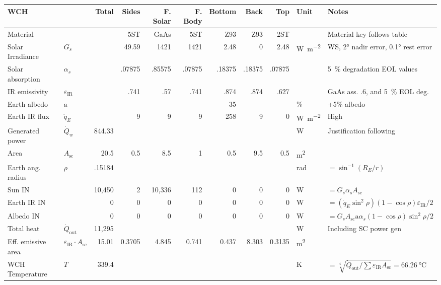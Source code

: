\documentclass[9pt]{article}
\begin{document}
\begin{landscape}
  \begin{table}[h]
    \centering
    \begin{tabularx}{1.00\linewidth}{ll|r|rrrrrr|l|X}
      \toprule
      WCH & & Total & Sides & F. Solar & F. Body & Bottom & Back & Top & Unit & Notes\\
      \midrule
      Material & & & 5ST & GaAs & 5ST & Z93 & Z93 & 2ST & & Material key follows table\\
      \midrule
      Solar Irradiance & $G_s$ & & 49.59 & 1421 & 1421 & 2.48 & 0 & 2.48 & \si{\watt\per\meter\squared} & WS, \ang{2} nadir error, \ang{0.1} rest error\\
      Solar absorption & $\alpha_s$ & & .07875 & .85575 & .07875 & .18375 & .18375 & .07875 & & \qty{5}{\percent} degradation EOL values\\
      IR emissivity & $\varepsilon_\text{IR}$ & & .741 & .57 & .741 & .874 & .874 & .627 & & GaAs ass. .6, and \qty{5}{\percent} EOL deg.\\
      Earth albedo & $\mathrm{a}$ & & & & & 35 &  & & \si{\percent} & +5\% albedo\\
      Earth IR flux & $\dot q_E$ & & 9 & 9 & 9 & 258 & 9 & 0 & \si{\watt\per\meter\squared} & High\\
      Generated power & $\dot Q_w$ & 844.33 & & & & & & & \si{\watt} & Justification following\\
      Area & $A_\text{sc}$ & 20.5 & 0.5 & 8.5 & 1 & 0.5 & 9.5 & 0.5 & \si{\meter\squared} & \\
      Earth ang. radius & $\rho$ & .15184 & & & & & & & \si{rad} & $=\sin^{-1}(R_E/r)$\\
      \midrule
      Sun IN & & 10,450 & 2 & 10,336 & 112 & 0 & 0 & 0 & \si{\watt} & $=G_s\alpha_s A_\text{sc}$\\
      Earth IR IN & & 0 & 0 & 0 & 0 & 0 & 0 & 0 & \si{\watt} & $=(\dot q_E\sin^2\rho)(1-\cos\rho)\varepsilon_\text{IR}/2$\\
      Albedo IN & & 0 & 0 & 0 & 0 & 0 & 0 & 0 & \si{\watt} & $=G_sA_\text{sc}\mathrm{a}\alpha_s(1-\cos\rho)\sin^2\rho/2$\\
      Total heat & $\dot Q_\text{out}$ & 11,295 & & & & & & & \si{\watt} & Including SC power gen\\
      \midrule
      Eff. emissive area & $\varepsilon_\text{IR}\cdot A_\text{sc}$ & 15.01 & 0.3705 & 4.845 & 0.741 & 0.437 & 8.303 & 0.3135 & \si{\meter\squared} & \\
      WCH Temperature & $T$  & 339.4 & & & & & & & \si{\kelvin} & $=\sqrt[4]{\dot{Q}_\text{out}/\sum{\varepsilon_\text{IR}A_\text{sc}}}=\qty{66.26}{\celsius}$\\

\end{tabularx}
\end{table}
\end{landscape}
\end{document}
